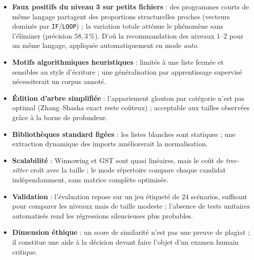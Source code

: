 \documentclass[10pt,a4paper]{article}
\begin{document}
\begin{itemize}
  \item \textbf{Faux positifs du niveau 3 sur petits fichiers} : des
        programmes courts de même langage partagent des proportions
        structurelles proches (vecteurs dominés par \texttt{IF}/\texttt{LOOP}) ;
        la variation totale atténue le phénomène sans l'éliminer
        (précision $58{,}3\,\%$). D'où la recommandation des niveaux 1--2 pour
        un même langage, appliquée automatiquement en mode \emph{auto}.
  \item \textbf{Motifs algorithmiques heuristiques} : limités à une liste
        fermée et sensibles au style d'écriture ; une généralisation par
        apprentissage supervisé nécessiterait un corpus annoté.
  \item \textbf{Édition d'arbre simplifiée} : l'appariement glouton par
        catégorie n'est pas optimal (Zhang--Shasha exact reste coûteux) ;
        acceptable aux tailles observées grâce à la borne de profondeur.
  \item \textbf{Bibliothèques standard figées} : les listes blanches sont
        statiques ; une extraction dynamique des imports améliorerait la
        normalisation.
  \item \textbf{Scalabilité} : Winnowing et GST sont quasi linéaires, mais le
        coût de \emph{tree-sitter} croît avec la taille ; le mode répertoire
        compare chaque candidat indépendamment, sans matrice complète
        optimisée.
  \item \textbf{Validation} : l'évaluation repose sur un jeu étiqueté de 24
        scénarios, suffisant pour comparer les niveaux mais de taille modeste ;
        l'absence de tests unitaires automatisés rend les régressions
        silencieuses plus probables.
  \item \textbf{Dimension éthique} : un score de similarité n'est pas une
        preuve de plagiat ; il constitue une aide à la décision devant faire
        l'objet d'un examen humain critique.
\end{itemize}
\end{document}

